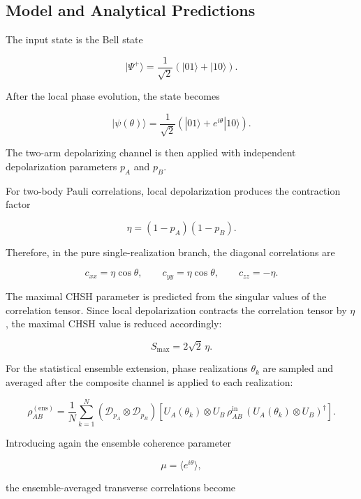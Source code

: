 \subsection*{Model and Analytical Predictions}

The input state is the Bell state

\[
|\Psi^+\rangle
=
\frac{1}{\sqrt{2}}
\left(
|01\rangle + |10\rangle
\right).
\]

After the local phase evolution, the state becomes

\[
|\psi(\theta)\rangle
=
\frac{1}{\sqrt{2}}
\left(
|01\rangle + e^{i\theta}|10\rangle
\right).
\]

The two-arm depolarizing channel is then applied with independent depolarization parameters \( p_A \) and \( p_B \).

For two-body Pauli correlations, local depolarization produces the contraction factor

\begin{equation}
\eta
=
(1-p_A)(1-p_B).
\label{eq:experiment5_eta_definition}
\end{equation}

Therefore, in the pure single-realization branch, the diagonal correlations are

\[
c_{xx}
=
\eta \cos\theta,
\qquad
c_{yy}
=
\eta \cos\theta,
\qquad
c_{zz}
=
-\eta.
\]

The maximal CHSH parameter is predicted from the singular values of the correlation tensor. Since local depolarization contracts the correlation tensor by \( \eta \), the maximal CHSH value is reduced accordingly:

\[
S_{\max}
=
2\sqrt{2}\,\eta.
\]

For the statistical ensemble extension, phase realizations \( \theta_k \) are sampled and averaged after the composite channel is applied to each realization:

\begin{equation}
\rho_{AB}^{\mathrm{(ens)}}
=
\frac{1}{N}
\sum_{k=1}^{N}
\left(
\mathcal{D}_{p_A}
\otimes
\mathcal{D}_{p_B}
\right)
\left[
U_A(\theta_k)
\otimes
U_B
\,
\rho_{AB}^{\mathrm{in}}
\,
\left(
U_A(\theta_k)
\otimes
U_B
\right)^{\dagger}
\right].
\label{eq:experiment5_composite_ensemble}
\end{equation}

Introducing again the ensemble coherence parameter

\[
\mu
=
\langle e^{i\theta} \rangle,
\]

the ensemble-averaged transverse correlations become

